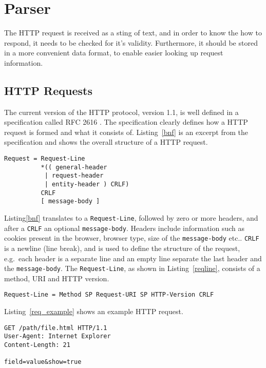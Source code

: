 \section{Parser}

The HTTP request is received as a sting of text, and in order to know the how
to respond, it needs to be checked for it's validity. Furthermore, it should
be stored in a more convenient data format, to enable easier looking up
request information.

\subsection{HTTP Requests}
The current version of the HTTP protocol, version 1.1, is well defined in a
specification called RFC 2616 \cite{rfc}. The specification clearly defines how
a HTTP request is formed and what it consists of. Listing~\ref{bnf} is an
excerpt from the specification and shows the overall structure of a HTTP
request.

\bigskip
\begin{lstlisting}[label=bnf,caption=HTTP request structure]
Request = Request-Line
          *(( general-header
           | request-header
           | entity-header ) CRLF)
          CRLF
          [ message-body ]
\end{lstlisting}

Listing\ref{bnf} translates to a \texttt{Request-Line}, followed by zero or
more headers, and after a \texttt{CRLF} an optional \texttt{message-body}.
Headers include information such as cookies present in the browser, browser
type, size of the \texttt{message-body} etc.. \texttt{CRLF} is a newline (line
break), and is used to define the structure of the request, e.g.\ each
header is a separate line and an empty line separate the last header and the
\texttt{message-body}. The \texttt{Request-Line}, as shown in
Listing~\ref{reqline}, consists of a method, URI and HTTP version.

\bigskip
\begin{lstlisting}[label=reqline,caption=HTTP Request-Line]
Request-Line = Method SP Request-URI SP HTTP-Version CRLF
\end{lstlisting}

Listing~\ref{req_example} shows an example HTTP request.

\bigskip
\begin{lstlisting}[label=req_example,caption=Example HTTP request]
GET /path/file.html HTTP/1.1
User-Agent: Internet Explorer
Content-Length: 21

field=value&show=true
\end{lstlisting}

